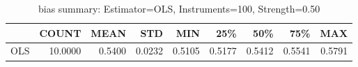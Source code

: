 \begin{table}[ht]
\centering
\caption{bias summary: Estimator=OLS, Instruments=100, Strength=0.50}
\begin{tabular}{lrrrrrrrr}
\toprule
 & COUNT & MEAN & STD & MIN & 25\% & 50\% & 75\% & MAX \\
\midrule
OLS & 10.0000 & 0.5400 & 0.0232 & 0.5105 & 0.5177 & 0.5412 & 0.5541 & 0.5791 \\
\bottomrule
\end{tabular}
\end{table}
